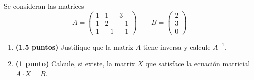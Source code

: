 
Se consideran las matrices
\[
  A=\begin{pmatrix}1&1&3\\1&2&-1\\1&-1&-1\end{pmatrix}
  \qquad B=\begin{pmatrix}2\\3\\0\end{pmatrix}
\]
\begin{enumerate}[label=\alph*)]
  \item \textbf{(1.5 puntos)} Justifique que la matriz $A$ tiene inversa y
  calcule $A^{-1}$.
  \item \textbf{(1 punto)} Calcule, si existe, la matrix $X$ que satisface
  la ecuación matricial $A\cdot X=B$.
\end{enumerate}
